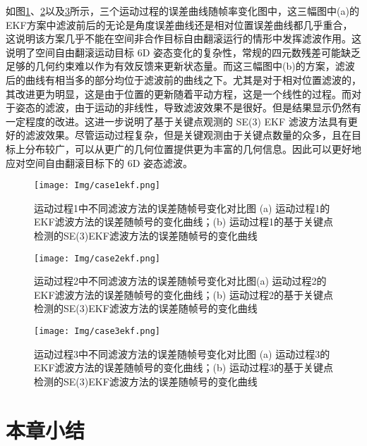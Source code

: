 如图\ref{fig:case1efk}、\ref{fig:case2efk}以及\ref{fig:case3efk}所示，三个运动过程的误差曲线随帧率变化图中，这三幅图中(a)的EKF方案中滤波前后的无论是角度误差曲线还是相对位置误差曲线都几乎重合，这说明该方案几乎不能在空间非合作目标自由翻滚运行的情形中发挥滤波作用。这说明了空间自由翻滚运动目标 6D 姿态变化的复杂性，常规的四元数残差可能缺乏足够的几何约束难以作为有效反馈来更新状态量。而这三幅图中(b)的方案，滤波后的曲线有相当多的部分均位于滤波前的曲线之下。尤其是对于相对位置滤波的，其改进更为明显，这是由于位置的更新随着平动方程，这是一个线性的过程。而对于姿态的滤波，由于运动的非线性，导致滤波效果不是很好。但是结果显示仍然有一定程度的改进。这进一步说明了基于关键点观测的 SE(3) EKF 滤波方法具有更好的滤波效果。尽管运动过程复杂，但是关键观测由于关键点数量的众多，且在目标上分布较广，可以从更广的几何位置提供更为丰富的几何信息。因此可以更好地应对空间自由翻滚目标下的 6D 姿态滤波。

\begin{figure}[htbp]
	\centering
	\texttt{[image: Img/case1ekf.png]}
	\caption{运动过程1中不同滤波方法的误差随帧号变化对比图 (a) 运动过程1的EKF滤波方法的误差随帧号的变化曲线；(b) 运动过程1的基于关键点检测的SE(3)EKF滤波方法的误差随帧号的变化曲线}
	\label{fig:case1efk}
\end{figure}

\begin{figure}[htbp]
	\centering
	\texttt{[image: Img/case2ekf.png]}
	\caption{运动过程2中不同滤波方法的误差随帧号变化对比图(a) 运动过程2的EKF滤波方法的误差随帧号的变化曲线；(b) 运动过程2的基于关键点检测的SE(3)EKF滤波方法的误差随帧号的变化曲线}
	\label{fig:case2efk}
\end{figure}

\begin{figure}[htbp]
	\centering
	\texttt{[image: Img/case3ekf.png]}
	\caption{运动过程3中不同滤波方法的误差随帧号变化对比图 (a) 运动过程3的EKF滤波方法的误差随帧号的变化曲线；(b) 运动过程3的基于关键点检测的SE(3)EKF滤波方法的误差随帧号的变化曲线}
	\label{fig:case3efk}
\end{figure}


\section{本章小结}
\label{sec:chapter_summary}

